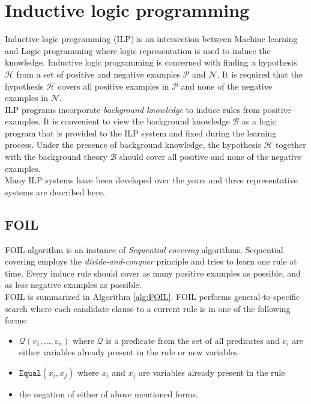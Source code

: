 \section{Inductive logic programming}

Inductive logic programming (ILP) is an intersection between Machine learning and Logic programming where logic representation is used to induce the knowledge. Inductive logic programming is concerned with finding a hypothesis $\mathcal{H}$ from a set of positive and negative examples $\mathcal{P}$ and $\mathcal{N}$. It is required that the hypothesis $\mathcal{H}$ covers all positive examples in $\mathcal{P}$ and none of the negative examples in $\mathcal{N}$. \\

ILP programs incorporate \textit{background knowledge} to induce rules from positive examples. It is convenient to view the background knowledge $\mathcal{B}$ as a logic program that is provided to the ILP system and fixed during the learning process. Under the presence of background knowledge, the hypothesis $\mathcal{H}$ together with the background theory $\mathcal{B}$ should cover all positive and none of the negative examples. \\

Many ILP systems have been developed over the years and three representative systems are described here.

\subsection{FOIL}

FOIL algorithm is an instance of \textit{Sequential covering} algorithms. Sequential covering employs the \textit{divide-and-conquer} principle and tries to learn one rule at time. Every induce rule should cover as many positive examples as possible, and as less negative examples as possible. \\

FOIL is summarized in Algorithm \ref{alg:FOIL}. FOIL performs general-to-specific search where each candidate clause to a current rule is in one of the following forms:

\begin{itemize}
	\item $\mathcal{Q}(v_1,\ldots, v_n)$ where $\mathcal{Q}$ is a predicate from the set of all predicates and $v_i$ are either variables already present in the rule or new variables
	\item $\mathtt{Equal}(x_i, x_j)$ where $x_i \text{ and } x_j$ are variables already present in the rule
	\item the negation of either of above mentioned forms.
\end{itemize}

